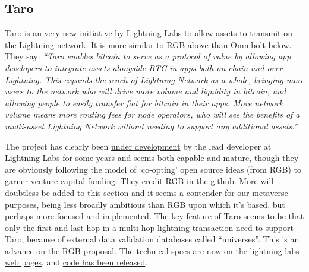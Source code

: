 \subsection{Taro}
Taro is an very new \href{https://lightning.engineering/posts/2022-4-5-taro-launch/}{initiative by Lightning Labs} to allow assets to transmit on the Lightning network. It is more similar to RGB above than Omnibolt below. They say: \textit{``Taro enables bitcoin to serve as a protocol of value by allowing app developers to integrate assets alongside BTC in apps both on-chain and over Lightning. This expands the reach of Lightning Network as a whole, bringing more users to the network who will drive more volume and liquidity in bitcoin, and allowing people to easily transfer fiat for bitcoin in their apps. More network volume means more routing fees for node operators, who will see the benefits of a multi-asset Lightning Network without needing to support any additional assets.''}\par
The project has clearly been \href{https://github.com/roasbeef/bips/tree/bip-taro}{under development} by the lead developer at Lightning Labs for some years and seems both \href{https://lightninglabs.substack.com/p/bitcoinizing-the-dollar-and-the-world?s=r}{capable} and mature, though they are obviously following the model of `co-opting' open source ideas (from RGB) to garner venture capital funding. They \href{https://github.com/bitcoin/bips/pull/1298/commits/4daba8c373c777defb48136795382803c137502c}{credit RGB} in the github. More will doubtless be added to this section and it seems a contender for our metaverse purposes, being less broadly ambitious than RGB upon which it's based, but perhaps more focused and implemented. The key feature of Taro seems to be that only the first and last hop in a multi-hop lightning transaction need to support Taro, because of external data validation databases called ``universes''. This is an advance on the RGB proposal. 
The technical specs are now on the \href{https://docs.lightning.engineering/the-lightning-network/taro}{lightning labs web pages}, and \href{https://lightning.engineering/posts/2022-9-28-taro-launch/}{code has been released}.

